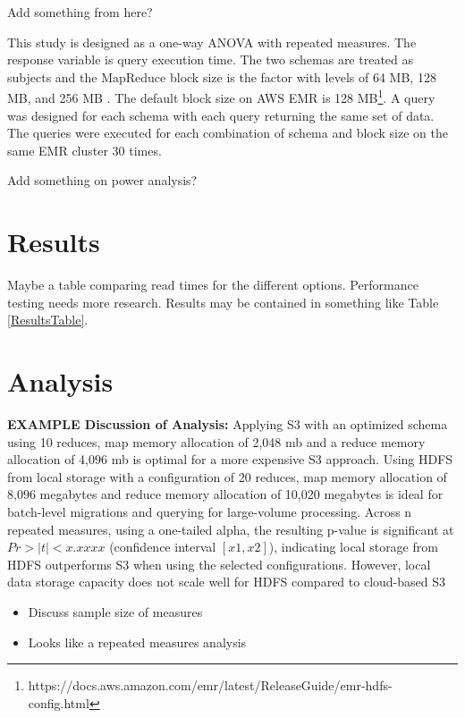 \documentclass[journal]{IEEEtran}
\begin{document}
Add something from \cite{OptimizeHadoop} here?

This study is designed as a one-way ANOVA with repeated measures.
The response variable is query execution time.
The two schemas are treated as subjects and the MapReduce block size is the factor with
 levels of 64 MB, 128 MB, and 256 MB \cite{Sleuth}.
The default block size on AWS EMR is 128
 MB\footnote{https://docs.aws.amazon.com/emr/latest/ReleaseGuide/emr-hdfs-config.html}.
A query was designed for each schema with each query returning the same set of data.
The queries were executed for each combination of schema and block size
 on the same EMR cluster 30 times.

Add something on power analysis?

\section{Results}

Maybe a table comparing read times for the different options.
Performance testing needs more research.
Results may be contained in something like Table \ref{ResultsTable}.

\section{Analysis}

\textbf{EXAMPLE Discussion of Analysis:} Applying S3 with an optimized schema using 10 reduces, map memory allocation of 2,048 mb and a reduce memory allocation of 4,096 mb is optimal for a more expensive S3 approach. Using HDFS from local storage with a configuration of 20 reduces, map memory allocation of 8,096 megabytes and reduce memory allocation of 10,020 megabytes is ideal for batch-level migrations and querying for large-volume processing. Across n repeated measures, using a one-tailed alpha, the resulting p-value is significant at $Pr > |t| < x.xxxx$ (confidence interval $[x1, x2]$), indicating local storage from HDFS outperforms S3 when using the selected configurations. However, local data storage capacity does not scale well for HDFS compared to cloud-based S3



\begin{itemize}
    \item Discuss sample size of measures
    \item Looks like a repeated measures analysis
\end{itemize}
\end{document}
